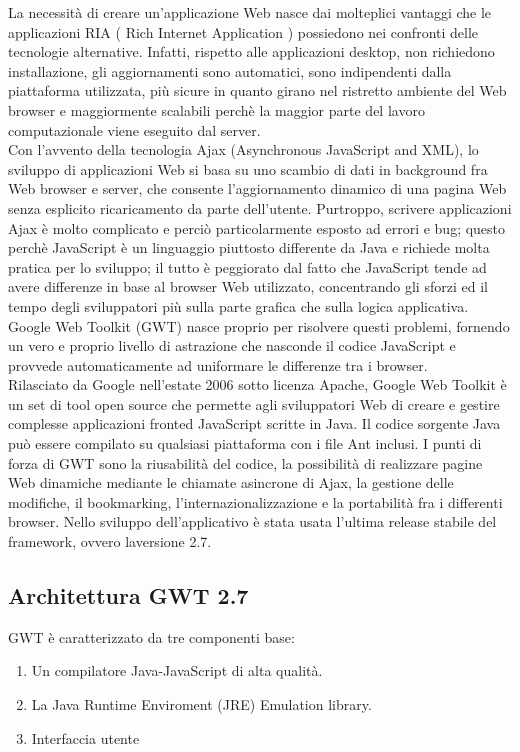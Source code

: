 La necessit\`a di creare un'applicazione Web nasce dai molteplici vantaggi che le applicazioni RIA ( Rich Internet Application ) possiedono nei confronti delle tecnologie alternative. Infatti, rispetto alle applicazioni desktop, non richiedono installazione, gli aggiornamenti sono automatici, sono indipendenti dalla piattaforma utilizzata, pi\`u sicure in quanto girano nel ristretto ambiente del Web browser e maggiormente scalabili perch\`e la maggior parte del lavoro computazionale viene eseguito dal server.\\
Con l'avvento della tecnologia Ajax (Asynchronous JavaScript and XML), lo sviluppo di applicazioni Web si basa su uno scambio di dati in background fra Web browser e server, che
consente l'aggiornamento dinamico di una pagina Web senza esplicito ricaricamento da parte dell'utente. Purtroppo, scrivere applicazioni Ajax \`e molto complicato e perci\`o particolarmente esposto ad errori e bug; questo perch\`e JavaScript \`e un linguaggio piuttosto differente da Java e richiede molta pratica per lo sviluppo; il tutto \`e peggiorato dal fatto che JavaScript tende ad avere differenze in base al browser Web utilizzato, concentrando gli sforzi ed il tempo degli sviluppatori pi\`u sulla parte grafica che sulla logica applicativa. Google Web Toolkit (GWT) nasce proprio per risolvere questi problemi, fornendo un vero e proprio livello di astrazione che nasconde il codice JavaScript e provvede automaticamente ad uniformare le differenze tra i browser. \\
Rilasciato da Google nell'estate 2006 sotto licenza Apache, Google Web Toolkit \`e un set di tool open source che permette agli sviluppatori Web di creare e gestire complesse applicazioni fronted JavaScript scritte in Java. Il codice sorgente Java pu\`o essere compilato su qualsiasi piattaforma con i file Ant inclusi. I punti di forza di GWT sono la riusabilit\`a del codice, la possibilit\`a di realizzare pagine Web dinamiche mediante le chiamate asincrone di Ajax, la gestione delle modifiche, il bookmarking, l'internazionalizzazione e la portabilit\`a fra i differenti browser. 
Nello sviluppo dell'applicativo è stata usata l'ultima release stabile del framework, ovvero laversione 2.7.
\subsection{Architettura GWT 2.7}
GWT \`e caratterizzato da tre componenti base:
\begin{enumerate}
\item Un compilatore Java-JavaScript di alta qualit\`a.
\item La Java Runtime Enviroment (JRE) Emulation library.
\item Interfaccia utente
\end{enumerate}

